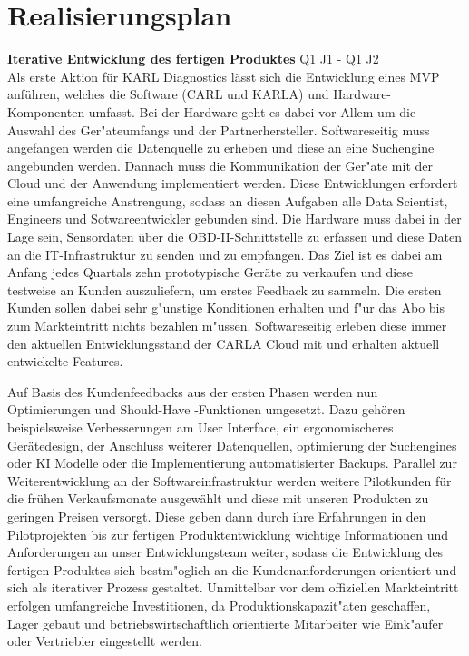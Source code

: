 \newpage
\section{Realisierungsplan}

\textbf{Iterative Entwicklung des fertigen Produktes} Q1 J1 - Q1 J2 \\
Als erste Aktion f\"ur KARL Diagnostics l\"asst sich die Entwicklung eines \ac{MVP} anf\"uhren, welches die Software (\ac{CARL} und \ac{KARLA}) und Hardware-Komponenten umfasst. Bei der Hardware geht es dabei vor Allem um die Auswahl des Ger"ateumfangs und der Partnerhersteller. Softwareseitig muss angefangen werden die Datenquelle zu erheben und diese an eine Suchengine angebunden werden. Dannach muss die Kommunikation der Ger"ate mit der Cloud und der Anwendung implementiert werden. Diese Entwicklungen erfordert eine umfangreiche Anstrengung, sodass an diesen Aufgaben alle Data Scientist, Engineers und Sotwareentwickler gebunden sind. Die Hardware muss dabei in der Lage sein, Sensordaten \"uber die \ac{OBD}-II-Schnittstelle zu erfassen und diese Daten an die IT-Infrastruktur zu senden und zu empfangen.
Das Ziel ist es dabei am Anfang jedes Quartals zehn prototypische Ger\"ate zu verkaufen und diese testweise an Kunden auszuliefern, um erstes Feedback zu sammeln. Die ersten Kunden sollen dabei sehr g"unstige Konditionen erhalten und f"ur das Abo bis zum Markteintritt nichts bezahlen m"ussen. Softwareseitig erleben diese immer den aktuellen Entwicklungsstand der CARLA Cloud mit und erhalten aktuell entwickelte Features.

Auf Basis des Kundenfeedbacks aus der ersten Phasen werden nun Optimierungen und \glqq Should-Have \grqq-Funktionen umgesetzt. Dazu geh\"oren beispielsweise Verbesserungen am User Interface, ein ergonomischeres Ger\"atedesign, der Anschluss weiterer Datenquellen, optimierung der Suchengines oder \ac{KI} Modelle oder die Implementierung automatisierter Backups. Parallel zur Weiterentwicklung an der Softwareinfrastruktur werden weitere Pilotkunden f\"ur die fr\"uhen Verkaufsmonate ausgew\"ahlt und diese mit unseren Produkten zu geringen Preisen versorgt. Diese geben dann durch ihre Erfahrungen in den Pilotprojekten bis zur fertigen Produktentwicklung wichtige Informationen und Anforderungen an unser Entwicklungsteam weiter, sodass die Entwicklung des fertigen Produktes sich bestm"oglich an die Kundenanforderungen orientiert und sich als iterativer Prozess gestaltet. Unmittelbar vor dem offiziellen Markteintritt erfolgen umfangreiche Investitionen, da Produktionskapazit"aten geschaffen, Lager gebaut und betriebswirtschaftlich orientierte Mitarbeiter wie Eink"aufer oder Vertriebler eingestellt werden. 



